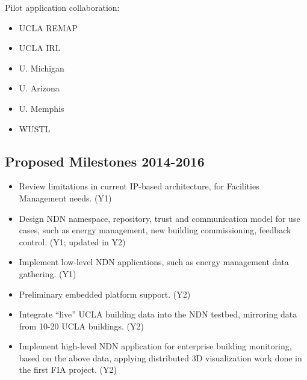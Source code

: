 Pilot application collaboration:
\begin{itemize}
\item UCLA REMAP
\item UCLA IRL
\item U. Michigan
\item U. Arizona
\item U. Memphis
\item WUSTL
\end{itemize}

\subsection{Proposed Milestones 2014-2016}

\begin{itemize}
\item Review limitations in current IP-based architecture, for Facilities Management needs. (Y1)
\item Design NDN namespace, repository, trust and communication model for use cases, such as energy management, new building commissioning, feedback control. (Y1; updated in Y2)
\item Implement low-level NDN applications, such as energy management data gathering. (Y1)
\item Preliminary embedded platform support. (Y2)
\item Integrate “live” UCLA building data into the NDN testbed, mirroring data from 10-20 UCLA buildings. (Y2)
\item Implement high-level NDN application for enterprise building monitoring, based on the above data, applying distributed 3D visualization work done in the first FIA project. (Y2)
\end{itemize}


